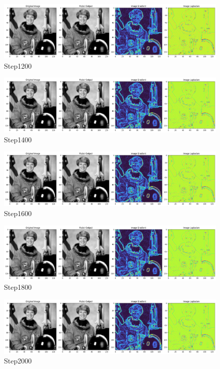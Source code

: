 \documentclass[12pt]{article}
\begin{document}
\begin{figure}[h]
    \centering 
    \includegraphics[width=1.0\textwidth]{training_plot6.png}
    \caption{Step1200}
\end{figure}
\begin{figure}[h]
    \centering 
    \includegraphics[width=1.0\textwidth]{training_plot7.png}
    \caption{Step1400}
\end{figure}
\begin{figure}[h]
    \centering 
    \includegraphics[width=1.0\textwidth]{training_plot8.png}
    \caption{Step1600}
\end{figure}
\begin{figure}[h]
    \centering 
    \includegraphics[width=1.0\textwidth]{training_plot9.png}
    \caption{Step1800}
\end{figure}
\begin{figure}[h]
    \centering 
    \includegraphics[width=1.0\textwidth]{training_plot10.png}
    \caption{Step2000}
\end{figure}
\end{document}
